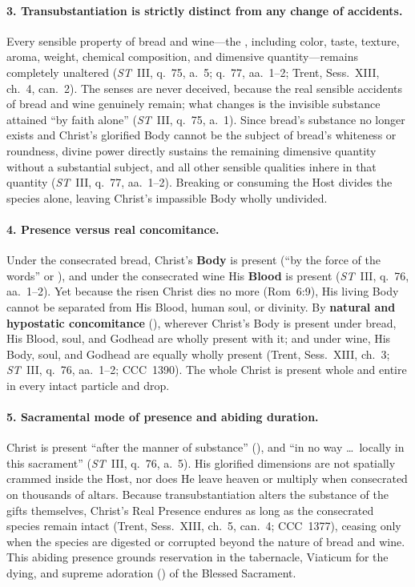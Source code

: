 \paragraph{3. Transubstantiation is strictly distinct from any change of accidents.}
Every sensible property of bread and wine---the , including color, taste, texture, aroma, weight, chemical composition, and dimensive quantity---remains completely unaltered (\emph{ST}~III, q.~75, a.~5; q.~77, aa.~1--2; Trent, Sess.~XIII, ch.~4, can.~2). The senses are never deceived, because the real sensible accidents of bread and wine genuinely remain; what changes is the invisible substance attained ``by faith alone'' (\emph{ST}~III, q.~75, a.~1). Since bread's substance no longer exists and Christ's glorified Body cannot be the subject of bread's whiteness or roundness, divine power directly sustains the remaining dimensive quantity without a substantial subject, and all other sensible qualities inhere in that quantity (\emph{ST}~III, q.~77, aa.~1--2). Breaking or consuming the Host divides the species alone, leaving Christ's impassible Body wholly undivided.

\paragraph{4. Presence  versus real concomitance.}
Under the consecrated bread, Christ's \textbf{Body} is present  (``by the force of the words'' or ), and under the consecrated wine His \textbf{Blood} is present  (\emph{ST}~III, q.~76, aa.~1--2). Yet because the risen Christ dies no more (Rom~6:9), His living Body cannot be separated from His Blood, human soul, or divinity. By \textbf{natural and hypostatic concomitance} (), wherever Christ's Body is present under bread, His Blood, soul, and Godhead are wholly present with it; and under wine, His Body, soul, and Godhead are equally wholly present (Trent, Sess.~XIII, ch.~3; \emph{ST}~III, q.~76, aa.~1--2; CCC~1390). The whole Christ is present whole and entire in every intact particle and drop.

\paragraph{5. Sacramental mode of presence and abiding duration.}
Christ is present ``after the manner of substance'' (), and ``in no way \dots\ locally in this sacrament'' (\emph{ST}~III, q.~76, a.~5). His glorified dimensions are not spatially crammed inside the Host, nor does He leave heaven or multiply when consecrated on thousands of altars. Because transubstantiation alters the substance of the gifts themselves, Christ's Real Presence endures as long as the consecrated species remain intact (Trent, Sess.~XIII, ch.~5, can.~4; CCC~1377), ceasing only when the species are digested or corrupted beyond the nature of bread and wine. This abiding presence grounds reservation in the tabernacle, Viaticum for the dying, and supreme adoration () of the Blessed Sacrament.

